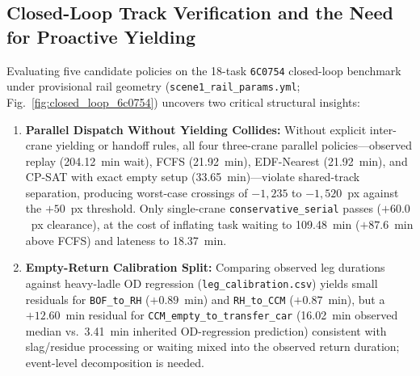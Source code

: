 \documentclass[11pt,a4paper]{article}
\begin{document}
\subsection{Closed-Loop Track Verification and the Need for Proactive Yielding}
Evaluating five candidate policies on the 18-task \texttt{6C0754} closed-loop benchmark under provisional rail geometry (\texttt{scene1\_rail\_params.yml}; Fig.~\ref{fig:closed_loop_6c0754}) uncovers two critical structural insights:
\begin{enumerate}[leftmargin=1.5em,itemsep=2pt]
  \item \textbf{Parallel Dispatch Without Yielding Collides:} Without explicit inter-crane yielding or handoff rules, all four three-crane parallel policies---observed replay (204.12~min wait), FCFS (21.92~min), EDF-Nearest (21.92~min), and CP-SAT with exact empty setup (33.65~min)---violate shared-track separation, producing worst-case crossings of $-1{,}235$ to $-1{,}520$~px against the $+50$~px threshold. Only single-crane \texttt{conservative\_serial} passes ($+60.0$~px clearance), at the cost of inflating task waiting to 109.48~min ($+87.6$~min above FCFS) and lateness to 18.37~min.
  \item \textbf{Empty-Return Calibration Split:} Comparing observed leg durations against heavy-ladle OD regression (\texttt{leg\_calibration.csv}) yields small residuals for \texttt{BOF\_to\_RH} ($+0.89$~min) and \texttt{RH\_to\_CCM} ($+0.87$~min), but a $+12.60$~min residual for \texttt{CCM\_empty\_to\_transfer\_car} (16.02~min observed median vs.\ 3.41~min inherited OD-regression prediction) consistent with slag/residue processing or waiting mixed into the observed return duration; event-level decomposition is needed.
\end{enumerate}

\begin{table}[htbp]
\centering
\small
\caption{Five-Policy Closed-Loop Comparison on Cast \texttt{6C0754} (18 Tasks; Provisional Geometry)}
\label{tab:closed_loop_6c0754}
\end{table}
\end{document}
